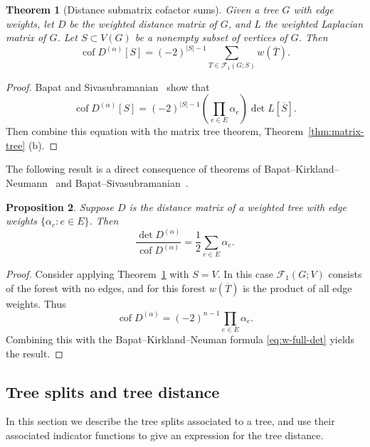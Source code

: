 \documentclass{amsart}
\newtheorem{thm}{Theorem}[section]
\newtheorem{prop}[thm]{Proposition}
\theoremstyle{definition}
\newcommand{\Da}{{D^{(\alpha)}}}
\DeclareMathOperator{\cof}{cof}
\newcommand{\trees}{\mathcal{F}_1}
\begin{document}
\begin{thm}[Distance submatrix cofactor sums]
\label{thm:distance-sub-cof}
Given a tree $G$ with edge weights,
let $D$ be the weighted distance matrix of $G$, and $L$ the weighted Laplacian matrix of $G$.
Let $S \subset V(G)$ be a nonempty subset of vertices of $G$. 
Then
\begin{equation}
	\cof \Da[S] = (-2)^{|S|-1} \sum_{T \in \trees(G; S)} w(\overline{T}).
\end{equation}
\end{thm}
\begin{proof}
Bapat and Sivasubramanian~\cite[Theorem 11]{bapat-sivasubramanian}
show that
\[
	\cof \Da[S] = (-2)^{|S|-1} \left( \prod_{e \in E} \alpha_e \right) \det L[\overline S] .
\]
Then combine this equation with the matrix tree theorem,
Theorem~\ref{thm:matrix-tree} (b).
\end{proof}

The following result is a direct consequence of theorems of Bapat--Kirkland--Neumann~\cite{bapat-kirkland-neumann} and Bapat--Sivasubramanian~\cite{bapat-sivasubramanian}.

\begin{prop}
\label{prop:full-det-cof-ratio}
Suppose $D$ is the distance matrix of a weighted tree with edge weights $\{\alpha_e : e \in E\}$.
Then
\[
	\frac{\det \Da}{\cof \Da} = \frac1{2} \sum_{e \in E} \alpha_e .
\]
\end{prop}
\begin{proof}
Consider applying Theorem~\ref{thm:distance-sub-cof} with $S = V$.
In this case $\trees(G; V)$ consists of the forest with no edges, and for this forest $w(\overline{T})$ is the product of all edge weights.
Thus
\[
	\cof \Da = (-2)^{n - 1} \prod_{e \in E} \alpha_e .
\]
Combining this with the Bapat--Kirkland--Neuman formula \eqref{eq:w-full-det} yields the result.
\end{proof}

\subsection{Tree splits and tree distance}
\label{sec:tree-splits}

In this section we describe the tree splits associated to a tree, and use their associated indicator functions to give an expression for the tree distance.
\end{document}
